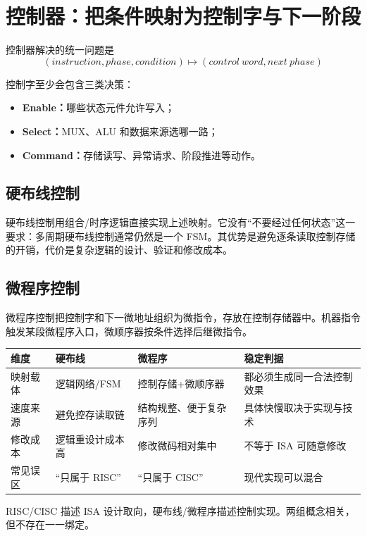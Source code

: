 \documentclass[UTF8,fontset=fandol,11pt,a4paper]{ctexart}
\newcommand{\kw}[1]{\textbf{\color{deep}#1}}
\begin{document}
\section{控制器：把条件映射为控制字与下一阶段}

控制器解决的统一问题是
\[
\boxed{
(instruction,phase,condition)
\longmapsto
(control\ word,next\ phase)
}
\]

控制字至少会包含三类决策：
\begin{itemize}
  \item \kw{Enable：}哪些状态元件允许写入；
  \item \kw{Select：}MUX、ALU 和数据来源选哪一路；
  \item \kw{Command：}存储读写、异常请求、阶段推进等动作。
\end{itemize}

\subsection{硬布线控制}

硬布线控制用组合/时序逻辑直接实现上述映射。它没有“不要经过任何状态”这一要求：多周期硬布线控制通常仍然是一个 FSM。其优势是避免逐条读取控制存储的开销，代价是复杂逻辑的设计、验证和修改成本。

\subsection{微程序控制}

微程序控制把控制字和下一微地址组织为微指令，存放在控制存储器中。机器指令触发某段微程序入口，微顺序器按条件选择后继微指令。

\begin{center}
\small
\begin{tabularx}{\linewidth}{L{2.2cm}YYL{3.5cm}}
\toprule
维度 & 硬布线 & 微程序 & 稳定判据 \\
\midrule
映射载体 & 逻辑网络/FSM & 控制存储+微顺序器 & 都必须生成同一合法控制效果 \\
速度来源 & 避免控存读取链 & 结构规整、便于复杂序列 & 具体快慢取决于实现与技术 \\
修改成本 & 逻辑重设计成本高 & 修改微码相对集中 & 不等于 ISA 可随意修改 \\
常见误区 & “只属于 RISC” & “只属于 CISC” & 现代实现可以混合 \\
\bottomrule
\end{tabularx}
\end{center}

RISC/CISC 描述 ISA 设计取向，硬布线/微程序描述控制实现。两组概念相关，但不存在一一绑定。
\end{document}
